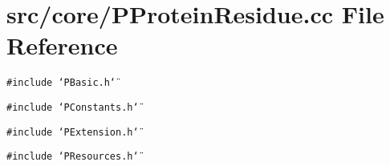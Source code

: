 \section{src/core/PProtein\-Residue.cc File Reference}
\label{PProteinResidue_8cc}


{\tt \#include \char`\"{}PBasic.h\char`\"{}}\par
{\tt \#include \char`\"{}PConstants.h\char`\"{}}\par
{\tt \#include \char`\"{}PExtension.h\char`\"{}}\par
{\tt \#include \char`\"{}PResources.h\char`\"{}}\par
